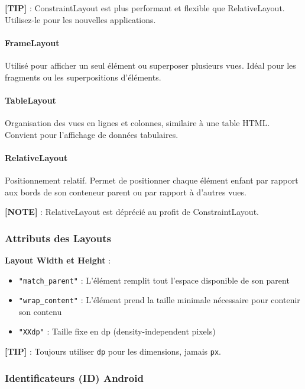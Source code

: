 \documentclass[11pt,a4paper]{article}
\begin{document}
\textbf{[TIP]} : ConstraintLayout est plus performant et flexible que RelativeLayout. Utilisez-le pour les nouvelles applications.

\paragraph{FrameLayout}

Utilisé pour afficher un seul élément ou superposer plusieurs vues. Idéal pour les fragments ou les superpositions d'éléments.

\paragraph{TableLayout}

Organisation des vues en lignes et colonnes, similaire à une table HTML. Convient pour l'affichage de données tabulaires.

\paragraph{RelativeLayout}

Positionnement relatif. Permet de positionner chaque élément enfant par rapport aux bords de son conteneur parent ou par rapport à d'autres vues.

\textbf{[NOTE]} : RelativeLayout est déprécié au profit de ConstraintLayout.

\subsubsection{Attributs des Layouts}

\textbf{Layout Width et Height} :
\begin{itemize}
    \item \texttt{"match\_parent"} : L'élément remplit tout l'espace disponible de son parent
    \item \texttt{"wrap\_content"} : L'élément prend la taille minimale nécessaire pour contenir son contenu
    \item \texttt{"XXdp"} : Taille fixe en dp (density-independent pixels)
\end{itemize}

\textbf{[TIP]} : Toujours utiliser \texttt{dp} pour les dimensions, jamais \texttt{px}.

\subsubsection{Identificateurs (ID) Android}
\end{document}
